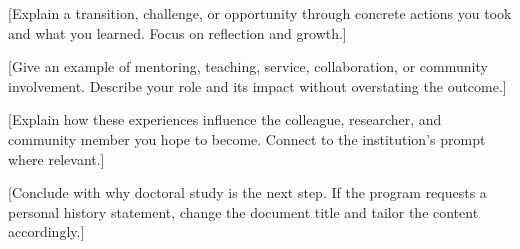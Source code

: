\documentclass[11pt]{article}
\begin{document}

[Explain a transition, challenge, or opportunity through concrete actions you took and what you learned. Focus on reflection and growth.]

[Give an example of mentoring, teaching, service, collaboration, or community involvement. Describe your role and its impact without overstating the outcome.]

[Explain how these experiences influence the colleague, researcher, and community member you hope to become. Connect to the institution's prompt where relevant.]

[Conclude with why doctoral study is the next step. If the program requests a personal history statement, change the document title and tailor the content accordingly.]
\end{document}
